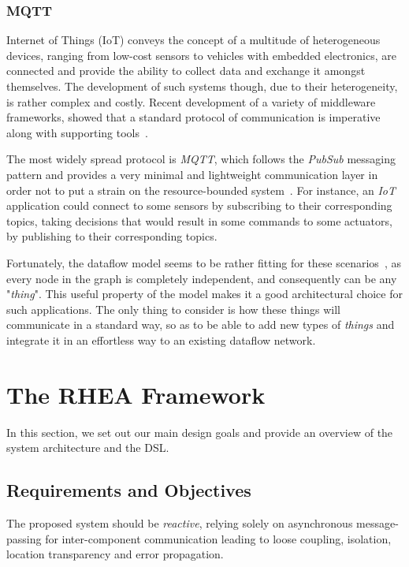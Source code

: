 \documentclass[sigplan,screen,10pt]{acmart}
\begin{document}
\subsubsection{MQTT}
Internet of Things (IoT) conveys the concept of a multitude of heterogeneous devices,
ranging from low-cost sensors to vehicles with embedded electronics, are connected and
provide the ability to collect data and exchange it amongst themselves.
The development of such systems though, due to their heterogeneity, is rather
complex and costly. Recent development of a variety of middleware frameworks,
showed that a standard protocol of communication is imperative along with supporting
tools~\cite{iot_middleware}.

The most widely spread protocol is \textit{MQTT}, which follows the \textit{PubSub}
messaging pattern and provides a very minimal and lightweight communication layer
in order not to put a strain on the resource-bounded system~\cite{mqtt}.
For instance, an \textit{IoT} application could connect to some sensors by
subscribing to their corresponding topics, taking decisions that would result in
some commands to some actuators, by publishing to their corresponding topics.

Fortunately, the dataflow model seems to be rather fitting for these
scenarios~\cite{iot_dataflow}, as every node in the graph is completely
independent, and consequently can be any "\textit{thing}". This useful property
of the model makes it a good architectural choice for such applications. The
only thing to consider is how these things will communicate in a standard way,
so as to be able to add new types of \textit{things} and integrate it in an
effortless way to an existing dataflow network.

\section{The RHEA Framework} \label{sec:approach}

In this section, we set out our main design goals and provide an overview
of the system architecture and the DSL.

\subsection{Requirements and Objectives} \label{sec:requirements}

The proposed system should be \textit{reactive}, relying solely on asynchronous
message-passing for inter-component communication leading to loose coupling,
isolation, location transparency and error propagation.
\end{document}
